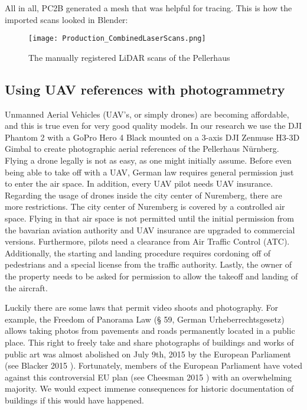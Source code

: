 All in all, PC2B generated a mesh that was helpful for tracing. This is how the imported scans looked in Blender:

\begin{figure}[h]
	\centering
	\texttt{[image: Production\_CombinedLaserScans.png]}
	\caption{The manually registered LiDAR scans of the Pellerhaus}
	\label{fig:production_laser_scans_combined}
\end{figure}




\subsection{Using UAV references with photogrammetry}

Unmanned Aerial Vehicles (UAV's, or simply drones) are becoming affordable, and this is true even for very good quality models. In our research we use the DJI Phantom 2 with a GoPro Hero 4 Black mounted on a 3-axis DJI Zenmuse H3-3D Gimbal to create photographic aerial references of the Pellerhaus Nürnberg.\\

Flying a drone legally is not as easy, as one might initially assume. Before even being able to take off with a UAV, German law requires general permission just to enter the air space. In addition, every UAV pilot needs UAV insurance.\\

Regarding the usage of drones inside the city center of Nuremberg, there are more restrictions. The city center of Nuremberg is covered by a controlled air space. Flying in that air space is not permitted until the initial permission from the bavarian aviation authority and UAV insurance are upgraded to commercial versions. Furthermore, pilots need a clearance from Air Traffic Control (ATC). Additionally, the starting and landing procedure requires cordoning off of pedestrians and a special license from the traffic authority. Lastly, the owner of the property needs to be asked for permission to allow the takeoff and landing of the aircraft.\\

\pagebreak

Luckily there are some laws that permit video shoots and photography. For example, the Freedom of Panorama Law (§ 59, German Urheberrechtsgesetz) allows taking photos from pavements and roads permanently located in a public place. This right to freely take and share photographs of buildings and works of public art was almost abolished on July 9th, 2015 by the European Parliament (see Blacker 2015 \parencite{freedomOfPanoramaUnderAttack}). Fortunately, members of the European Parliament have voted against this controversial EU plan (see Cheesman 2015 \parencite{freedomOfPanoramaSaved}) with an overwhelming majority. We would expect immense consequences for historic documentation of buildings if this would have happened.\\

